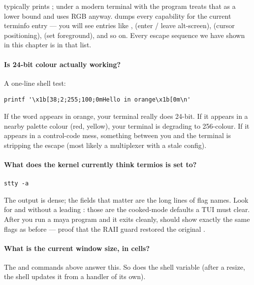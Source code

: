  typically prints ; under a modern
terminal with  the program treats that
as a lower bound and uses RGB anyway.  dumps every
capability for the current terminfo entry --- you will see entries
like ,  (enter / leave alt-screen),
 (cursor positioning),  (set foreground), and
so on. Every escape sequence we have shown in this chapter is in
that list.

\paragraph{Is 24-bit colour actually working?}
A one-line shell test:

\begin{lstlisting}[style=shell]
printf '\x1b[38;2;255;100;0mHello in orange\x1b[0m\n'
\end{lstlisting}

If the word  appears in orange, your terminal really does
24-bit. If it appears in a nearby palette colour (red, yellow), your
terminal is degrading to 256-colour. If it appears in a control-code
mess, something between you and the terminal is stripping the
escape (most likely a multiplexer with a stale config).

\paragraph{What does the kernel currently think termios is set to?}
\begin{lstlisting}[style=shell]
stty -a
\end{lstlisting}

The output is dense; the fields that matter are the long lines of
flag names. Look for  and  without a leading
\code{-}: those are the cooked-mode defaults a TUI must clear. After
you run a maya program and it exits cleanly,  should
show exactly the same flags as before --- proof that the RAII guard
restored the original .

\paragraph{What is the current window size, in cells?}
The  and  commands above answer
this. So does the shell variable  (after a resize,
the shell updates it from a  handler of its own).

